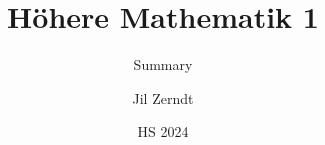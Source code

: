 \documentclass[a4paper, fontsize = 8pt, landscape]{scrartcl}
\title{Höhere Mathematik 1}
\subtitle{Summary}
\author{Jil Zerndt}
\date{HS 2024}
\begin{document}
\begin{multicols}{2}
	\thispagestyle{TitlePageStyle}
	\maketitleinfo
	\sffamily
	
	\raggedcolumns
	\columnbreak 
\end{multicols}
\end{document}
